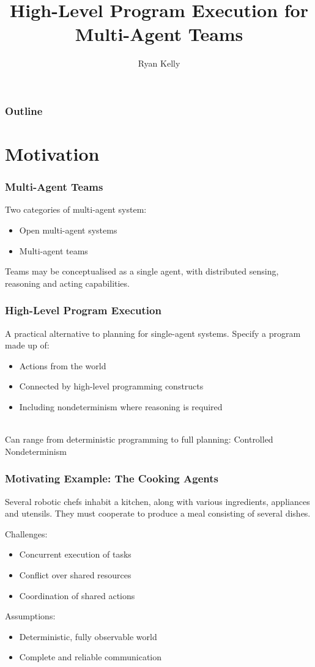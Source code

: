 \documentclass{beamer}
\title{High-Level Program Execution for Multi-Agent Teams}
\author{Ryan Kelly}
\begin{document}
\begin{frame}
  \titlepage
\end{frame}

\begin{frame}
  \frametitle{Outline}
  \tableofcontents
\end{frame}

\section{Motivation}

\begin{frame}
\frametitle{Multi-Agent Teams}
Two categories of multi-agent system:
\begin{itemize}
  \item Open multi-agent systems
  \item Multi-agent teams
\end{itemize}
Teams may be conceptualised as a single agent, with distributed sensing,
reasoning and acting capabilities.
\end{frame}

\begin{frame}
\frametitle{High-Level Program Execution}
A practical alternative to planning for single-agent systems. Specify
a program made up of:
\begin{itemize}
  \item Actions from the world
  \item Connected by high-level programming constructs
  \item Including nondeterminism where reasoning is required
\end{itemize}
\ \\
Can range from deterministic programming to full planning:
\alert{Controlled Nondeterminism}
\end{frame}

\begin{frame}
\frametitle{Motivating Example: The Cooking Agents}
Several robotic chefs inhabit a kitchen, along with various ingredients,
appliances and utensils.  They must cooperate to produce a meal consisting
of several dishes.

Challenges:
\begin{itemize}
  \item Concurrent execution of tasks
  \item Conflict over shared resources
  \item Coordination of shared actions
\end{itemize}

Assumptions:
\begin{itemize}
  \item Deterministic, fully observable world
  \item Complete and reliable communication
\end{itemize}
\end{frame}
\end{document}
